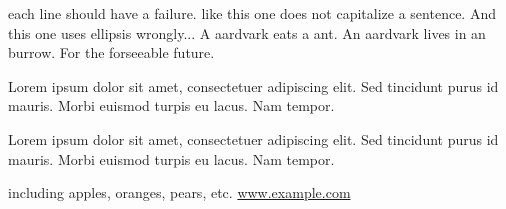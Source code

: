 each line should have a failure.  like this one does not capitalize a sentence.
And this one uses ellipsis wrongly...
A aardvark eats a ant.
An aardvark lives in an burrow.
For the forseeable future.
\caption{Lorem ipsum dolor sit amet, consectetuer adipiscing elit. Sed tincidunt purus id mauris. Morbi euismod turpis eu lacus. Nam tempor.}
\caption{\label{thelabel}Lorem ipsum dolor sit amet, consectetuer adipiscing elit. Sed tincidunt purus id mauris. Morbi euismod turpis eu lacus. Nam tempor.}
including apples, oranges, pears, etc.
\url{www.example.com}
